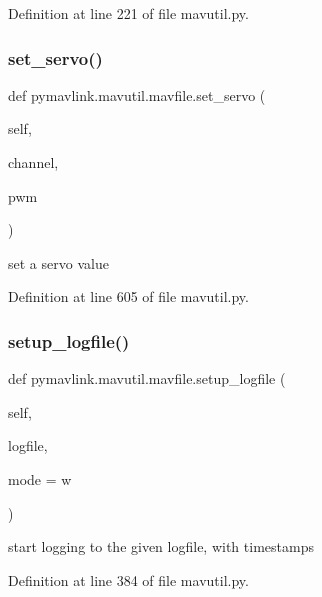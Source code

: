 Definition at line 221 of file mavutil.\+py.

\mbox{\label{classpymavlink_1_1mavutil_1_1mavfile_a5dcc6c45753772530e85f70d28407c03}} 
\subsubsection{\texorpdfstring{set\_servo()}{set\_servo()}}
{\footnotesize\ttfamily def pymavlink.\+mavutil.\+mavfile.\+set\+\_\+servo (\begin{DoxyParamCaption}\item[{}]{self,  }\item[{}]{channel,  }\item[{}]{pwm }\end{DoxyParamCaption})}

\begin{DoxyVerb}set a servo value\end{DoxyVerb}
 

Definition at line 605 of file mavutil.\+py.

\mbox{\label{classpymavlink_1_1mavutil_1_1mavfile_a3cae7386bd175b00f8ab23316165f47a}} 
\subsubsection{\texorpdfstring{setup\_logfile()}{setup\_logfile()}}
{\footnotesize\ttfamily def pymavlink.\+mavutil.\+mavfile.\+setup\+\_\+logfile (\begin{DoxyParamCaption}\item[{}]{self,  }\item[{}]{logfile,  }\item[{}]{mode = {\ttfamily \textquotesingle{}w\textquotesingle{}} }\end{DoxyParamCaption})}

\begin{DoxyVerb}start logging to the given logfile, with timestamps\end{DoxyVerb}
 

Definition at line 384 of file mavutil.\+py.


